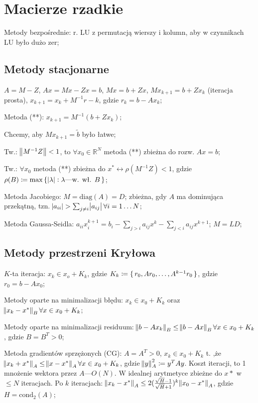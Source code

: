 \section{Macierze rzadkie}

\entry
Metody bezpośrednie: r. LU z permutacją wierszy i kolumn, aby w czynnikach LU było dużo zer;


\subsection{Metody stacjonarne}

\entry
$A=M-Z$, $Ax=Mx-Zx=b$, $Mx=b+Zx$, $Mx_{k+1}=b+Zx_{k}$ (iteracja prosta), $x_{k+1}=x_k+M^{-1}r-k$, gdzie $r_k=b-Ax_k$;

\entry
Metoda (**): $x_{k+1}=M^{-1}(b+Zx_k)$;

\entry
Chcemy, aby $Mx_{k+1}=\tilde{b}$ było łatwe;

\entry
Tw.: $\norm{M^{-1}Z} < 1$, to $\forall x_0 \in \mathbb{R}^N$ metoda (**) zbieżna do rozw. $Ax=b$;

\entry
Tw.: $\forall x_0$ metoda (**) zbieżna do $x^* \leftrightarrow \rho(M^{-1}Z) < 1$, gdzie $\rho(B) \coloneqq \max\set{\abs{\lambda} : \lambda\text{---w. wł. } B}$;

\entry
Metoda Jacobiego: $M=\mathrm{diag}(A) = D$; zbieżna, gdy $A$ ma dominująca przekątną, tzn. $\abs{a_{ii}} > \sum_{j\neq i}\abs{a_{ij}} \forall i=1\ldots N$;

\entry
Metoda Gaussa-Seidla: $a_{ii}x_i^{k+1}=b_i-\sum_{j>i}a_{ij}x^k-\sum_{j<i}a_{ij}x^{k+1}$; $M = LD$;

\subsection{Metody przestrzeni Kryłowa}

\entry
$K$-ta iteracja: $x_k\in x_o+K_k$, gdzie $K_k\coloneqq \set{r_0, Ar_0,\ldots, A^{k-1}r_0}$, gdzie $r_0=b-Ax_0$;

\entry
Metody oparte na minimalizacji błędu: $x_k\in x_0 +K_k$ oraz $\norm{x_k - x^*}_B \forall x\in x_0 + K_k$;

\entry
Metody oparte na minimalizacji residuum: $\norm{b-Ax_k}_B \leq \norm{b-Ax}_B \forall x\in x_0 +K_k$, gdzie $B=B^T>0$;

\entry
Metoda gradientów sprzężonych (CG): $A=A^T>0$, $x_k\in x_0 + K_k$ t. ,że $\norm{x_k+x^*}_A\leq \norm{x-x^*}_A \forall x\in x_0 + K_k$, gdzie $\norm{y}^2_A \coloneqq y^TAy$. Koszt iteracji, to 1 mnożenie wektora przez $A$---$O(N)$. W idealnej arytmetyce zbieżne do $x*$ w $\leq N$ iteracjach. Po $k$ iteracjach: $\norm{x_k - x^*}_A\leq 2(\frac{\sqrt{H} - 1}{\sqrt{H} + 1})^k\norm{x_0-x^*}_A$, gdzie $H=\mathrm{cond}_2(A)$;

